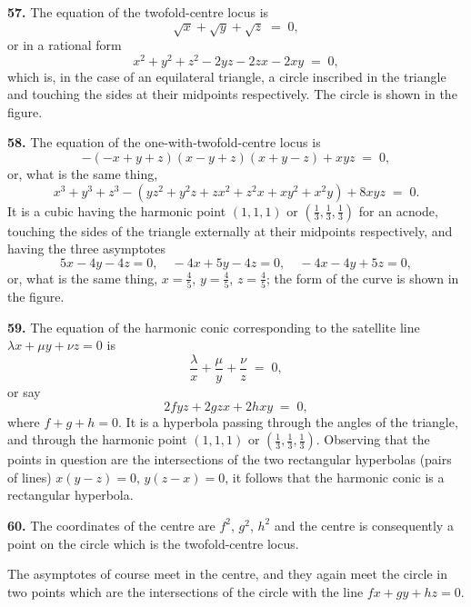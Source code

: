 \documentclass[11pt,a4paper]{article}
\begin{document}
\medskip

\textbf{57.} The equation of the twofold-centre locus is
\[
\sqrt{x}+\sqrt{y}+\sqrt{z} \;=\; 0,
\]
or in a rational form
\[
x^{2}+y^{2}+z^{2} - 2yz - 2zx - 2xy \;=\; 0,
\]
which is, in the case of an equilateral triangle, a circle inscribed in the triangle and touching the sides at their midpoints respectively. The circle is shown in the figure.

\medskip

\textbf{58.} The equation of the one-with-twofold-centre locus is
\[
-(-x+y+z)(x-y+z)(x+y-z) + xyz \;=\; 0,
\]
or, what is the same thing,
\[
x^{3}+y^{3}+z^{3} - (yz^{2}+y^{2}z+zx^{2}+z^{2}x+xy^{2}+x^{2}y) + 8xyz \;=\; 0.
\]
It is a cubic having the harmonic point $(1,1,1)$ or $(\tfrac{1}{3},\tfrac{1}{3},\tfrac{1}{3})$ for an acnode, touching the sides of the triangle externally at their midpoints respectively, and having the three asymptotes
\[
5x - 4y - 4z = 0,\quad -4x + 5y - 4z = 0,\quad -4x - 4y + 5z = 0,
\]
or, what is the same thing, $x=\tfrac{4}{5}$, $y=\tfrac{4}{5}$, $z=\tfrac{4}{5}$; the form of the curve is shown in the figure.

\medskip

\textbf{59.} The equation of the harmonic conic corresponding to the satellite line $\lambda x + \mu y + \nu z = 0$ is
\[
\frac{\lambda}{x} + \frac{\mu}{y} + \frac{\nu}{z} \;=\; 0,
\]
or say
\[
2 f y z + 2 g z x + 2 h x y \;=\; 0,
\]
where $f+g+h=0$. It is a hyperbola passing through the angles of the triangle, and through the harmonic point $(1,1,1)$ or $(\tfrac{1}{3},\tfrac{1}{3},\tfrac{1}{3})$. Observing that the points in question are the intersections of the two rectangular hyperbolas (pairs of lines) $x(y-z)=0$, $y(z-x)=0$, it follows that the harmonic conic is a rectangular hyperbola.

\medskip

\textbf{60.} The coordinates of the centre are $f^{2}$, $g^{2}$, $h^{2}$ and the centre is consequently a point on the circle which is the twofold-centre locus.

The asymptotes of course meet in the centre, and they again meet the circle in two points which are the intersections of the circle with the line $f x + g y + h z = 0$.

\medskip
\end{document}
